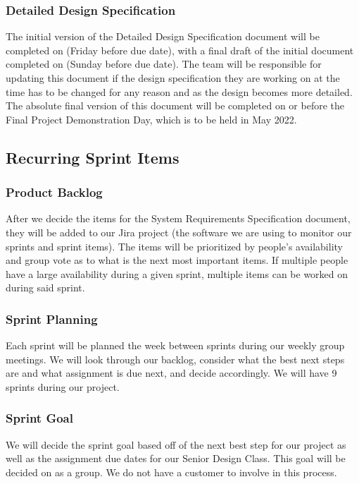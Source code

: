 \subsubsection{Detailed Design Specification}
The initial version of the Detailed Design Specification document will be completed on (Friday before due date), with a final draft of the initial document completed on (Sunday before due date). The team will be responsible for updating this document if the design specification they are working on at the time has to be changed for any reason and as the design becomes more detailed. The absolute final version of this document will be completed on or before the Final Project Demonstration Day, which is to be held in May 2022.

\subsection{Recurring Sprint Items}

\subsubsection{Product Backlog}
After we decide the items for the System Requirements Specification document, they will be added to our Jira project (the software we are using to monitor our sprints and sprint items). The items will be prioritized by people's availability and group vote as to what is the next most important items. If multiple people have a large availability during a given sprint, multiple items can be worked on during said sprint.

\subsubsection{Sprint Planning}
Each sprint will be planned the week between sprints during our weekly group meetings. We will look through our backlog, consider what the best next steps are and what assignment is due next, and decide accordingly. We will have 9 sprints during our project.

\subsubsection{Sprint Goal}
We will decide the sprint goal based off of the next best step for our project as well as the assignment due dates for our Senior Design Class. This goal will be decided on as a group. We do not have a customer to involve in this process.

